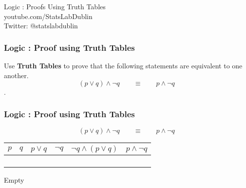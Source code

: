 \documentclass{beamer}
\begin{document}
\begin{frame}
\begin{center}
{ \Huge
Logic : Proofs Using Truth Tables }
\\
\bigskip
{ \Large
youtube.com/StatsLabDublin \\ \vspace{0.2cm} Twitter: @statslabdublin
}
\end{center}
\end{frame}

\begin{frame}
\frametitle{Logic :  Proof using Truth Tables}
\Large
\vspace{-1.0cm}
Use \textbf{Truth Tables} to prove that the following statements are equivalent to one another.
\[(p \vee q) \wedge \neg q \qquad \equiv \qquad  p\wedge \neg q\].
\end{frame}


\begin{frame}
\frametitle{Logic :  Proof using Truth Tables}
\LARGE
\vspace{-1.8cm}
\[(p \vee q) \wedge \neg q \qquad \equiv \qquad  p\wedge \neg q\]
\bigskip
\begin{tabular}{|c|c||c|c|c||c|}
\hline $p$ & $q$ & $p \vee q$ & $\neg q$ & $\neg q \wedge (p \vee q)$ & $p\wedge \neg q$ \\ 
\hline  &  &  &  &  &  \\ 
\hline  &  &  &  &  &  \\ 
\hline  &  &  &  &  &  \\ 
\hline  &  &  &  &  &  \\ 
\hline 
\end{tabular} 
\end{frame}

\begin{frame}
Empty
\end{frame}
\end{document}
